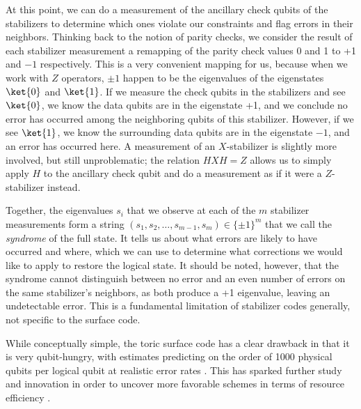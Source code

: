 At this point, we can do a measurement of the ancillary check qubits of the stabilizers to determine which ones violate our constraints and flag errors in their neighbors. Thinking back to the notion of parity checks, we consider the result of each stabilizer measurement a remapping of the parity check values 0 and 1 to +1 and $-1$ respectively. This is a very convenient mapping for us, because when we work with $Z$ operators, $\pm 1$ happen to be the eigenvalues of the eigenstates $\ket{0}$ and $\ket{1}$. 
If we measure the check qubits in the stabilizers and see $\ket{0}$, we know the data qubits are in the eigenstate +1, and we conclude no error has occurred among the neighboring qubits of this stabilizer. However, if we see $\ket{1}$, we know the surrounding data qubits are in the eigenstate $-1$, and an error has occurred here. A measurement of an $X$-stabilizer is slightly more involved, but still unproblematic; the relation $HXH = Z$ allows us to simply apply $H$ to the ancillary check qubit and do a measurement as if it were a $Z$-stabilizer instead. 

Together, the eigenvalues $s_i$ that we observe at each of the $m$ stabilizer measurements form a string $(s_1, s_2, \dots, s_{m-1}, s_m) \in \{\pm1\}^m$ that we call the \emph{syndrome} of the full state. It tells us about what errors are likely to have occurred and where, which we can use to determine what corrections we would like to apply to restore the logical state. It should be noted, however, that the syndrome cannot distinguish between no error and an even number of errors on the same stabilizer's neighbors, as both produce a +1 eigenvalue, leaving an undetectable error. This is a fundamental limitation of stabilizer codes generally, not specific to the surface code.

While conceptually simple, the toric surface code has a clear drawback in that it is very qubit-hungry, with estimates predicting on the order of 1000 physical qubits per logical qubit at realistic error rates \cite{jaques2024ches_presentation,Gidney2025}. This has sparked further study and innovation in order to uncover more favorable schemes in terms of resource efficiency \cite{Bravyi2024}.

